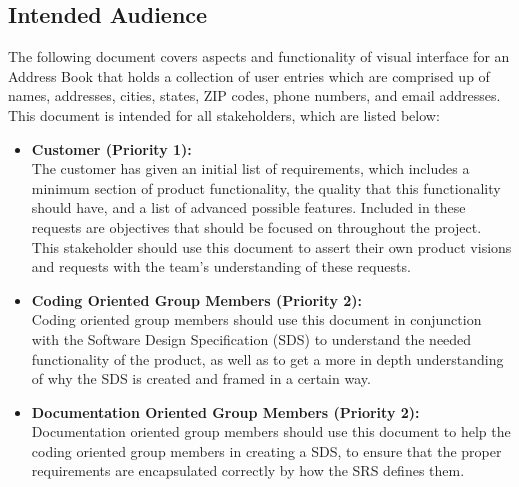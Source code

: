 \documentclass[a4paper, 11pt]{article}
\begin{document}
\subsection{Intended Audience}
The following document covers aspects and functionality of visual interface for an Address Book that holds a collection of user entries which are comprised up of names, addresses, cities, states, ZIP codes, phone numbers, and email addresses. This document is intended for all stakeholders, which are listed below:
\begin{itemize}
	\item \textbf{Customer (Priority 1):} \\ The customer has given an initial list of requirements, which includes a minimum section of product functionality, the quality that this functionality should have, and a list of advanced possible features. Included in these requests are objectives that should be focused on throughout the project. This stakeholder should use this document to assert their own product visions and requests with the team's understanding of these requests. 
	\item \textbf{Coding Oriented Group Members (Priority 2):} \\ Coding oriented group members should use this document in conjunction with the Software Design Specification (SDS) to understand the needed functionality of the product, as well as to get a more in depth understanding of why the SDS is created and framed in a certain way.
	\item \textbf{Documentation Oriented Group Members (Priority 2):} \\ Documentation oriented group members should use this document to help the coding oriented group members in creating a SDS, to ensure that the proper requirements are encapsulated correctly by how the SRS defines them.
\end{itemize}
\end{document}
